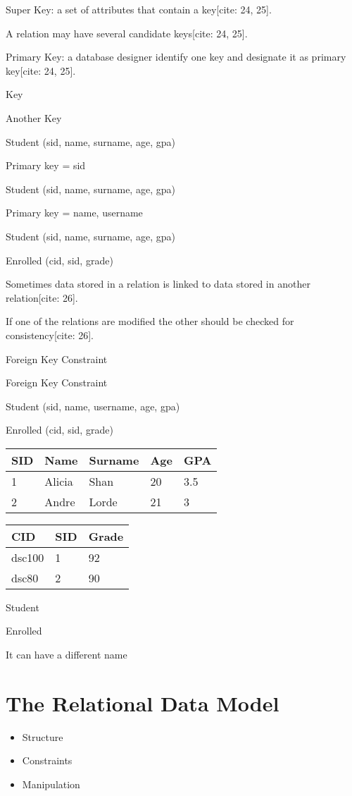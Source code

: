 \documentclass{article}
\begin{document}
Super Key: a set of attributes that contain a key[cite: 24, 25].

A relation may have several candidate keys[cite: 24, 25].

Primary Key: a database designer identify one key and designate it as primary key[cite: 24, 25].

Key

Another Key

Student (sid, name, surname, age, gpa)

Primary key = sid

Student (sid, name, surname, age, gpa)

Primary key = name, username

Student (sid, name, surname, age, gpa)

Enrolled (cid, sid, grade)

Sometimes data stored in a relation is linked to data stored in another relation[cite: 26].

If one of the relations are modified the other should be checked for consistency[cite: 26].

Foreign Key Constraint

Foreign Key Constraint

Student (sid, name, username, age, gpa)

Enrolled (cid, sid, grade)

\begin{tabular}{lllll}
\hline
SID & Name & Surname & Age & GPA \\
\hline
1 & Alicia & Shan & 20 & 3.5 \\
2 & Andre & Lorde & 21 & 3 \\
\hline
\end{tabular}

\begin{tabular}{lll}
\hline
CID & SID & Grade \\
\hline
dsc100 & 1 & 92 \\
dsc80 & 2 & 90 \\
\hline
\end{tabular}

Student

Enrolled

It can have a different name

\section*{The Relational Data Model}

\begin{itemize}
    \item Structure
    \item Constraints
    \item Manipulation
\end{itemize}
\end{document}
